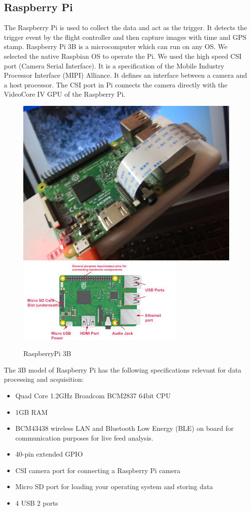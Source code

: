 \subsection{Raspberry Pi}
 The Raspberry Pi is used to collect the data and act as the trigger. It detects the trigger event by the flight controller and then capture images with time and GPS stamp. Raspberry Pi 3B is a microcomputer which can run on any OS. We selected the native Raspbian OS to operate the Pi. We used the high speed CSI port (Camera Serial Interface). It is a specification of the Mobile Industry Processor Interface (MIPI) Alliance. It defines an interface between a camera and a host processor. The CSI port in Pi connects the camera directly with the VideoCore IV GPU of the Raspberry Pi.
 \begin{figure}[H]
    \centering
    \includegraphics[width=0.5\linewidth]{SummerInterReport/project/Images-Major/pi_top.jpeg}
    \includegraphics[width=0.5\linewidth]{SummerInterReport/project/Images-Major/pi.jpg}
    \caption{RaspberryPi 3B}
    \label{fig:compEy}
\end{figure}
 The 3B model of Raspberry Pi has the following specifications relevant for data processing and acquisition:
 \begin{itemize}
     \item Quad Core 1.2GHz Broadcom BCM2837 64bit CPU
     \item 1GB RAM
     \item BCM43438 wireless LAN and Bluetooth Low Energy (BLE) on board for communication purposes for live feed analysis.
     \item 40-pin extended GPIO
     \item CSI camera port for connecting a Raspberry Pi camera
     \item Micro SD port for loading your operating system and storing data
     \item 4 USB 2 ports
 \end{itemize}
